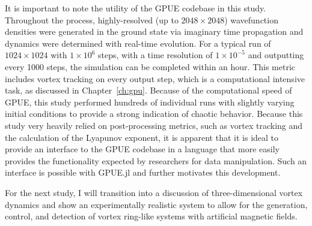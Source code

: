 It is important to note the utility of the GPUE codebase in this study.
Throughout the process, highly-resolved (up to $2048 \times 2048$) wavefunction densities were generated in the ground state via imaginary time propagation and dynamics were determined with real-time evolution.
For a typical run of $1024 \times 1024$ with $1\times 10^6$ steps, with a time resolution of $1\times 10^{-5}$ and outputting every 1000 steps, the simulation can be completed within an hour.
This metric includes vortex tracking on every output step, which is a computational intensive task, as discussed in Chapter~\ref{ch:gpu}.
Because of the computational speed of GPUE, this study performed hundreds of individual runs with slightly varying initial conditions to provide a strong indication of chaotic behavior.
Because this study very heavily relied on post-processing metrics, such as vortex tracking and the calculation of the Lyapunov exponent, it is apparent that it is ideal to provide an interface to the GPUE codebase in a language that more easily provides the functionality expected by researchers for data manipulation.
Such an interface is possible with GPUE.jl and further motivates this development.

For the next study, I will transition into a discussion of three-dimensional vortex dynamics and show an experimentally realistic system to allow for the generation, control, and detection of vortex ring-like systems with artificial magnetic fields.


